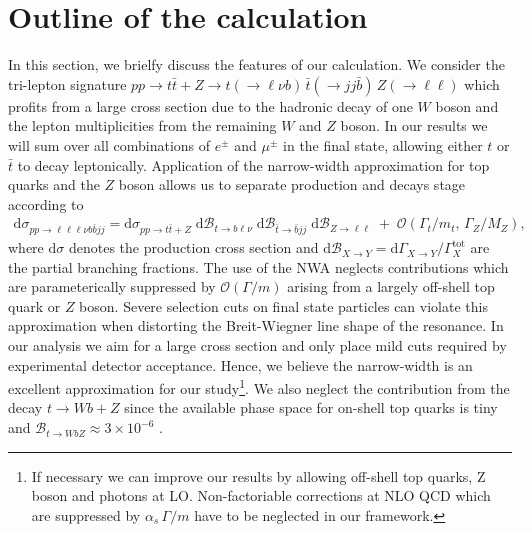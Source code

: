 \documentclass[preprint]{JHEP3} %
\newcommand{\mrm}{\mathrm}
\newcommand{\rd}{\mathrm{d}}
\newcommand{\Br}{\mathcal{B}}
\def\ttb{t\bar{t}}
\newcommand{\be}{\begin{eqnarray}}
\newcommand{\ee}{\end{eqnarray}}
\begin{document}
\section{Outline of the calculation}
In this section, we brielfy discuss the features of our calculation.
We consider the tri-lepton signature  
$pp \to \ttb + Z \to t(\to \ell \nu b) \, \bar{t} (\to jj \bar{b}) \, Z(\to \ell \ell)$
which profits from a large cross section due to the hadronic decay of one $W$ boson and the lepton multiplicities from the remaining $W$ and $Z$ boson.
In our results we will sum over all combinations of $e^\pm$ and $\mu^\pm$ in the final state, allowing either $t$ or $\bar t$ to decay leptonically.
Application of the narrow-width approximation for top quarks and the $Z$ boson allows us to separate production and decays stage according to 
\be
 \rd \sigma_{pp\to\ell\ell\ell\nu b \bar{b} jj} = \rd \sigma_{pp\to\ttb+Z} \; \rd\Br_{t\to b \ell\nu} \; \rd\Br_{\bar{t} \to \bar{b} jj} \; \rd\Br_{Z\to \ell\ell}
 \;+\; \mathcal{O}(\Gamma_t/m_t, \, \Gamma_Z/M_Z)
, \label{Xsec}
\ee
where $\rd \sigma$ denotes the production cross section and $\rd\Br_{X\to Y}= \rd \Gamma_{X\to Y} \big/ \Gamma^\mrm{tot}_X$ are the partial branching fractions.
The use of the NWA neglects contributions which are parameterically suppressed by $\mathcal{O}(\Gamma / m)$ arising from a largely off-shell top quark or $Z$ boson.
Severe selection cuts on final state particles can violate this approximation when distorting the Breit-Wiegner line shape of the resonance.
In our analysis we aim for a large cross section and only place mild cuts required by experimental detector acceptance. 
Hence, we believe the narrow-width is an excellent approximation for our study\footnote{
If necessary we can improve our results by allowing off-shell top quarks, Z boson and photons at LO.
Non-factoriable corrections at NLO QCD which are suppressed by $\alpha_s \, \Gamma/m$ have to be neglected in our framework.
}.
We also neglect the contribution from the decay $t \to Wb+Z$ since the available phase space for on-shell top quarks is tiny and $\Br_{t\to W bZ } \approx 3 \times 10^{-6}$ \cite{see Baur}.
\end{document}

